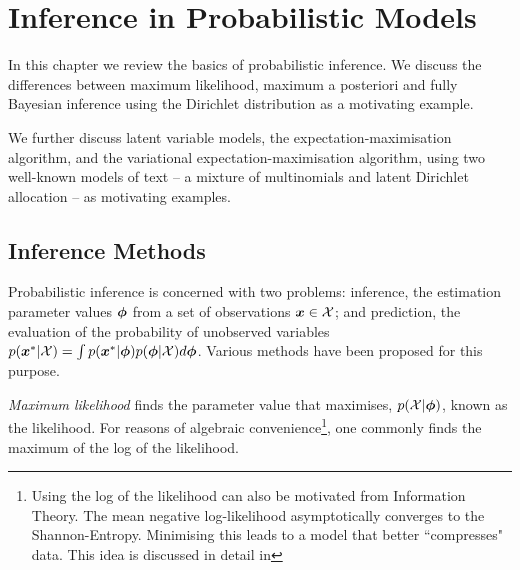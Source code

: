 

\newcommand \zd   { { \vv{z}_d } }
\newcommand \qfam { { \mathcal{Q} } }
\newcommand \xdat { { \mathcal{X} } }
\newcommand \zdat { { \mathcal{Z} } }
\newcommand \xnew { { \vv{x}^{*} } }
\newcommand \znew { { \vv{z}^{*} } }
\newcommand \param { { \vv{\phi} } }
\newcommand \params { { \Phi } }
\newcommand \ml[1] { { {#1}_{\text{ML}} } } 
\newcommand \map[1] { { {#1}_{\text{MAP}} } } 
\newcommand \quarter { { \oneover{4} } }
\newcommand \eighth { { \oneover{8} } }
\newcommand \fqt[1] { { \mathcal{F}\left( {#1} \right) } }
\newcommand \joint { { p(\xdat, \zdat | \params) } }
\newcommand \logjoint { { \ln \joint } }
\newcommand \exlogjoint[1] { { \ex{\logjoint}{{#1}} } }

\chapter{Inference in Probabilistic Models}
In this chapter we review the basics of probabilistic inference. We discuss the differences between maximum likelihood, maximum a posteriori and fully Bayesian inference using the Dirichlet distribution as a motivating example.

We further discuss latent variable models, the expectation-maximisation algorithm, and the variational expectation-maximisation algorithm, using two well-known models of text -- a mixture of multinomials and latent Dirichlet allocation -- as motivating examples.
 \section{Inference Methods}

Probabilistic inference is concerned with two problems: inference, the estimation parameter values $\param$ from a set of observations $\vv{x} \in \xdat$; and prediction, the evaluation of the probability of unobserved variables $p(\xnew | \xdat) = \int p(\xnew | \param) p(\param | \xdat) d\param$. Various methods have been proposed for this purpose.


\emph{Maximum likelihood} finds the parameter value that maximises, $p(\xdat|\param)$, known as the likelihood. For reasons of algebraic convenience\footnote{Using the log of the likelihood can also be motivated from Information Theory. The mean negative log-likelihood asymptotically converges to the Shannon-Entropy. Minimising this leads to a model that better ``compresses" data. This idea is discussed in detail in  }, one commonly finds the maximum of the log of the likelihood.


